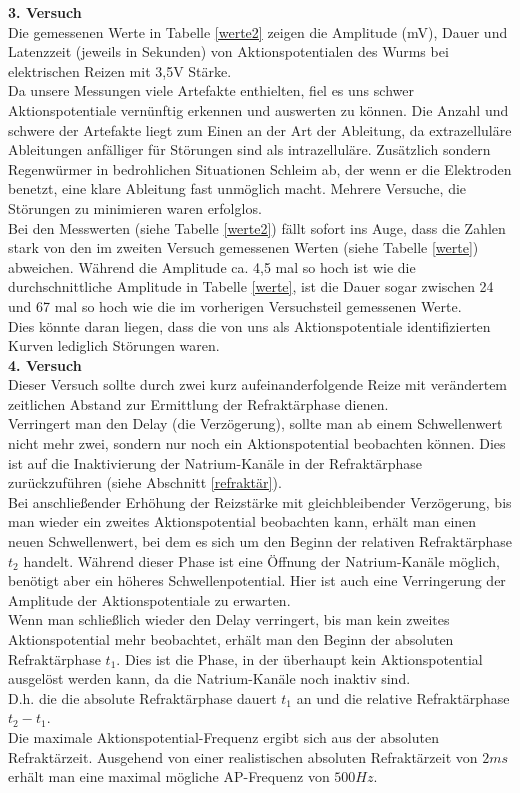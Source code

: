 \documentclass[11pt]{article}
\begin{document}
\textbf{3. Versuch}\\
Die gemessenen Werte in Tabelle \ref{werte2} zeigen die Amplitude (mV), Dauer und Latenzzeit (jeweils in Sekunden) von Aktionspotentialen des Wurms bei elektrischen Reizen mit 3,5V Stärke.\\
Da unsere Messungen viele Artefakte enthielten, fiel es uns schwer Aktionspotentiale vernünftig erkennen und auswerten zu können. Die Anzahl und schwere der Artefakte liegt zum Einen an der Art der Ableitung, da extrazelluläre Ableitungen anfälliger für Störungen sind als intrazelluläre. Zusätzlich sondern Regenwürmer in bedrohlichen Situationen Schleim ab, der wenn er die Elektroden benetzt, eine klare Ableitung fast unmöglich macht. Mehrere Versuche, die Störungen zu minimieren waren erfolglos.\\
Bei den Messwerten (siehe Tabelle \ref{werte2}) fällt sofort ins Auge, dass die Zahlen stark von den im zweiten Versuch gemessenen Werten (siehe Tabelle \ref{werte}) abweichen. Während die Amplitude ca. 4,5 mal so hoch ist wie die durchschnittliche Amplitude in Tabelle \ref{werte}, ist die Dauer sogar zwischen 24 und 67 mal so hoch wie die im vorherigen Versuchsteil gemessenen Werte.\\
Dies könnte daran liegen, dass die von uns als Aktionspotentiale identifizierten Kurven lediglich Störungen waren.\\

\textbf{4. Versuch}\\
Dieser Versuch sollte durch zwei kurz aufeinanderfolgende Reize mit verändertem zeitlichen Abstand zur Ermittlung der Refraktärphase dienen. \\
Verringert man den Delay (die Verzögerung), sollte man ab einem Schwellenwert nicht mehr zwei, sondern nur noch ein Aktionspotential beobachten können. Dies ist auf die Inaktivierung der Natrium-Kanäle in der Refraktärphase zurückzuführen (siehe Abschnitt \ref{refraktär}). \\
Bei anschließender Erhöhung der Reizstärke mit gleichbleibender Verzögerung, bis man wieder ein zweites Aktionspotential beobachten kann, erhält man einen neuen Schwellenwert, bei dem es sich um den Beginn der relativen Refraktärphase $t_2$ handelt. Während dieser Phase ist eine Öffnung der Natrium-Kanäle möglich, benötigt aber ein höheres Schwellenpotential. Hier ist auch eine Verringerung der Amplitude der Aktionspotentiale zu erwarten. \\
Wenn man schließlich wieder den Delay verringert, bis man kein zweites Aktionspotential mehr beobachtet, erhält man den Beginn der absoluten Refraktärphase $t_1$. Dies ist die Phase, in der überhaupt kein Aktionspotential ausgelöst werden kann, da die Natrium-Kanäle noch inaktiv sind. \\
D.h. die die absolute Refraktärphase dauert $t_1$ an und die relative Refraktärphase $t_2-t_1$. \\
Die maximale Aktionspotential-Frequenz ergibt sich aus der absoluten Refraktärzeit. Ausgehend von einer realistischen absoluten Refraktärzeit von $2ms$ erhält man eine maximal mögliche AP-Frequenz von $500Hz$. 
\end{document}
